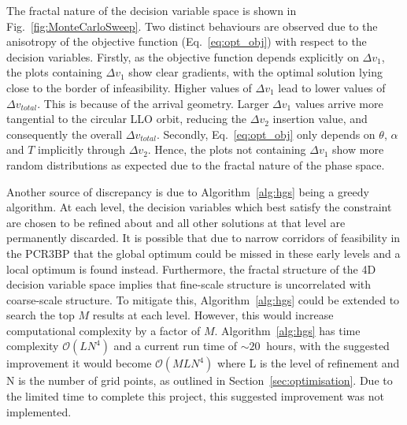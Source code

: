 \documentclass[10pt,twocolumn]{revtex4-2}    %
\begin{document}
The fractal nature of the decision variable space is shown in Fig.~\ref{fig:MonteCarloSweep}. Two distinct behaviours are observed due to the anisotropy of the objective function (Eq.~\ref{eq:opt_obj}) with respect to the decision variables. Firstly, as the objective function depends explicitly on $\Delta v_{1}$, the plots containing $\Delta v_{1}$ show clear gradients, with the optimal solution lying close to the border of infeasibility. Higher values of $\Delta v_{1}$ lead to lower values of $\Delta v_{total}$. This is because of the arrival geometry. Larger $\Delta v_{1}$ values arrive more tangential to the circular LLO orbit, reducing the $\Delta v_{2}$ insertion value, and consequently the overall $\Delta v_{total}$. Secondly, Eq.~\ref{eq:opt_obj} only depends on $\theta$, $\alpha$ and $T$ implicitly through $\Delta v_{2}$. Hence, the plots not containing $\Delta v_{1}$ show more random distributions as expected due to the fractal nature of the phase space.   

Another source of discrepancy is due to Algorithm~\ref{alg:hgs} being a greedy algorithm. At each level, the decision variables which best satisfy the constraint are chosen to be refined about and all other solutions at that level are permanently discarded. It is possible that due to narrow corridors of feasibility in the PCR3BP that the global optimum could be missed in these early levels and a local optimum is found instead. Furthermore, the fractal structure of the 4D decision variable space implies that fine-scale structure is uncorrelated with coarse-scale structure. To mitigate this, Algorithm~\ref{alg:hgs} could be extended to search the top $M$ results at each level. However, this would increase computational complexity by a factor of $M$. Algorithm~\ref{alg:hgs} has time complexity $\mathcal{O}(LN^{4}) $ and a current run time of $\sim 20~$ hours, with the suggested improvement it would become $\mathcal{O}(M LN^{4}) $ where L is the level of refinement and N is the number of grid points, as outlined in Section~\ref{sec:optimisation}. Due to the limited time to complete this project, this suggested improvement was not implemented.
\end{document}
